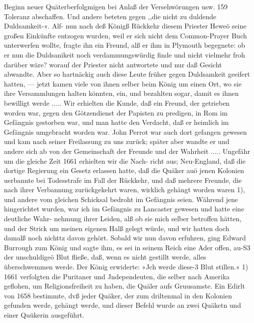 Beginn neuer Quäterberfolgmigen bei Anlaß der Versehwörungen usw. 159
Toleranz abschaffen. Und andere beteten gegen ,,die nicht zu
duldende Duldsamkeit-«. Alf- nun nach deß Königß Rückkehr
diesem Priester Heweö seine großen Einkünfte entzogen wurden,
weil er sich nicht dem Common-Prayer Buch unterwerfen wollte,
fragte ihn ein Freund, alß er ihm in Plymouth begegnete: ob er
nun die Duldsanikeit noch verdammungswürdig finde und nicht
vielmehr froh darüber wäre? worauf der Priester nicht antwortete
und nur daß Gesicht abwandte. Aber so hartnäckig auch diese
Leute früher gegen Duldsamkeit geeifert hatten, — jetzt kamen
viele von ihnen selber beim König um einen Ort, wo sie ihre
Versammlungen halten könnten, ein, und bezahlten sogar, damit
es ihnen bewilligt werde .....
Wir erhielten die Kunde, daß ein Freund, der getrieben worden
war, gegen den Götzendienst der Papisten zu predigen, in Rom
im Gefängnis gestorben war, und man hatte den Verdacht, daß
er heimlich im Gefängnis umgebracht worden war. John Perrot
war auch dort gefangen gewesen und kam nach seiner Freilassung
zu uns zurück; später aber wandte er und andere sich ab von
der Gemeinschaft der Freunde und der Wahrheit .....
Ungefähr um die gleiche Zeit 1661 erhielten wir die Nach-
richt aus; Neu-England, daß die dortige Regierung ein Gesetz
erlassen hatte, daß die Quäker auö jenen Kolonien uerbannte bei
Todesstrafe im Fall der Rückkehr, und daß mehrere Freunde, die
nach ihrer Verbannung zurückgekehrt waren, wirklich gehängt
worden waren 1), und andere vom gleichen Schicksal bedroht im
Gefängnis seien. Während jene hingerichtet wurden, war ich im
Gefängnis zu Lancaster gewesen und hatte eine deutliche Wahr-
nehmung ihrer Leiden, alß ob sie mich selber betroffen hätten,
und der Strick um meinen eigenen Halß gelegt würde, und wir
hatten doch damalß noch nichttz davon gehört. Sobald wir nun
davon erfuhren, ging Edward Burrough zum König und sagte
ihm, es sei in seinem Reich eine Ader offen, au-S3 der unschuldigeö
Blut fließe, daß, wenn es nicht gestillt werde, alles überschwemmen
werde. Der König erwiderte: »Jch werde diese-3 Blut stillen.«
1) 1661 verfolgten die Puritaner und Jndependeuten, die selber nach
Amerika geflohen, um Religionsfreiheit zu haben, die Quäler aufs Gruusamste.
Ein Edirlt von 1658 bestimmte, dvß jeder Quäker, der zum driltenmal in den
Kolonien gefunden werde, gehängt werde, und dieser Befehl wurde an zwei
Quäketn und einer Quükerin ausgeführt.

